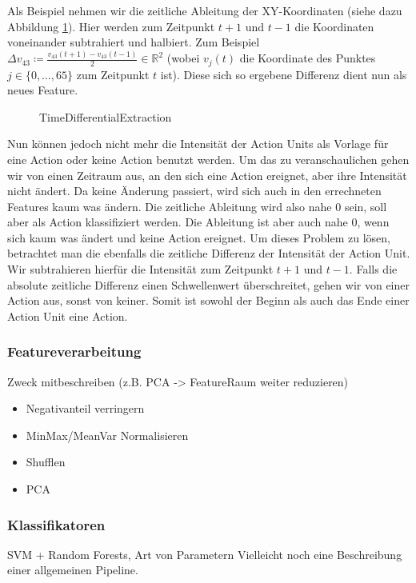 Als Beispiel nehmen wir die zeitliche Ableitung der XY-Koordinaten (siehe dazu Abbildung \ref{fig:timediff}). 
Hier werden zum Zeitpunkt $t+1$ und $t-1$ die Koordinaten voneinander subtrahiert und halbiert. Zum Beispiel $\Delta v_{43} \coloneqq \frac{v_{43}(t+1) - v_{43}(t-1)}{2}\in\mathbb{R}^2$ (wobei $v_{j}(t)$ die Koordinate des Punktes $j\in\{0,\ldots,65\}$ zum Zeitpunkt $t$ ist).
Diese sich so ergebene Differenz dient nun als neues Feature.

\begin{figure}

\caption{TimeDifferentialExtraction}
\label{fig:timediff}
\end{figure}

Nun können jedoch nicht mehr die Intensität der Action Units als Vorlage für eine Action oder keine Action benutzt werden. 
Um das zu veranschaulichen gehen wir von einen Zeitraum aus, an den sich eine Action ereignet, aber ihre Intensität nicht ändert.
Da keine Änderung passiert, wird sich auch in den errechneten Features kaum was ändern. Die zeitliche Ableitung wird also nahe $0$ sein, soll aber als Action klassifiziert werden. Die Ableitung ist aber auch nahe $0$, wenn sich kaum was ändert und keine Action ereignet.
Um dieses Problem zu lösen, betrachtet man die ebenfalls die zeitliche Differenz der Intensität der Action Unit. Wir subtrahieren hierfür die Intensität zum Zeitpunkt $t+1$ und $t-1$. Falls die absolute zeitliche Differenz einen Schwellenwert überschreitet, gehen wir von einer Action aus, sonst von keiner. Somit ist sowohl der Beginn als auch das Ende einer Action Unit eine Action.

\subsubsection{Featureverarbeitung}
Zweck mitbeschreiben (z.B. PCA -> FeatureRaum weiter reduzieren)
\begin{itemize}
  \item Negativanteil verringern
  \item MinMax/MeanVar Normalisieren
  \item Shufflen
  \item PCA
\end{itemize}

\subsubsection{Klassifikatoren}
SVM + Random Forests, Art von Parametern
Vielleicht noch eine Beschreibung einer allgemeinen Pipeline.



